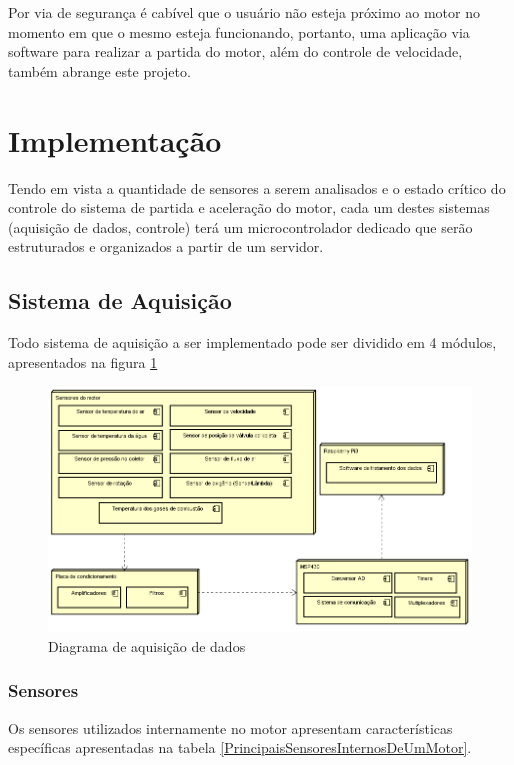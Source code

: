 Por via de segurança é cabível que o usuário não esteja próximo ao motor no momento em que o mesmo esteja funcionando, portanto, uma aplicação via software para realizar a partida do motor, além do controle de velocidade, também abrange este projeto.

\section{Implementação}

Tendo em vista a quantidade de sensores a serem analisados e o estado crítico do controle do sistema de partida e aceleração do motor, cada um destes sistemas (aquisição de dados, controle) terá um microcontrolador dedicado que serão estruturados e organizados a partir de um servidor.

\subsection{Sistema de Aquisição}

Todo sistema de aquisição a ser implementado pode ser dividido em 4 módulos, apresentados na figura \ref{diagramaDeAquisicaoDeDados}

\begin{figure}[h!]
	\centering
	\includegraphics[keepaspectratio=true,scale= 0.7]{figuras/Diagrama.PNG}
	\caption{Diagrama de aquisição de dados}
	\label{diagramaDeAquisicaoDeDados}
\end{figure}

\subsubsection{Sensores}

Os sensores utilizados internamente no motor apresentam características específicas apresentadas na tabela \ref{PrincipaisSensoresInternosDeUmMotor}.


